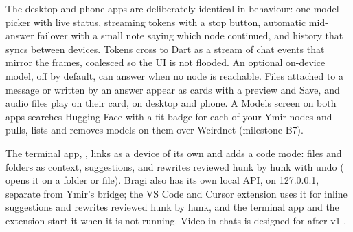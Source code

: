 The desktop and phone apps are deliberately identical in behaviour: one model picker with live
status, streaming tokens with a stop button, automatic mid-answer failover with a small note
saying which node continued, and history that syncs between devices. Tokens cross to Dart as a
stream of chat events that mirror the  frames, coalesced so the UI is not flooded.
An optional on-device model, off by default, can answer when no node is reachable.
Files attached to a message or written by an answer appear as cards with a preview and Save, and audio
files play on their card, on desktop and phone. A Models screen on both apps searches Hugging Face with
a fit badge for each of your Ymir nodes and pulls, lists and removes models on them over Weirdnet
(milestone B7).

The terminal app, , links as a device of its own and adds a code mode: files and folders
as context, suggestions, and rewrites reviewed hunk by hunk with undo ( opens it on a
folder or file). Bragi also has its own local API,  on 127.0.0.1, separate from Ymir's
bridge; the VS Code and Cursor extension uses it for inline suggestions and rewrites reviewed hunk by
hunk, and the terminal app and the extension start it when it is not running. Video in chats is
designed for after v1 \planned.
